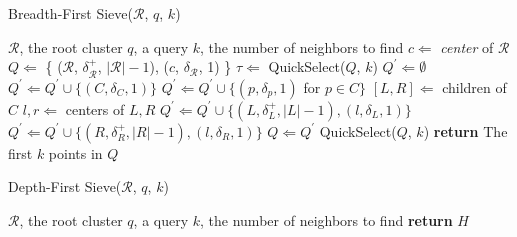 \documentclass{article}
\begin{document}
\begin{algorithm}
    \caption{Breadth-First Sieve($\mathcal{R}$, $q$, $k$)} %
    \label{alg:methods:bredth-first-sieve} %
    \begin{algorithmic} %
        \Require $\mathcal{R}$, the root cluster
        \Require $q$, a query
        \Require $k$, the number of neighbors to find
        \State $c \Leftarrow$ \textit{center} of $\mathcal{R}$
        \State $Q \Leftarrow$ \{ ($\mathcal{R}$, $\delta^{+}_{\mathcal{R}}$, $|\mathcal{R}| - 1$), ($c$, $\delta_{\mathcal{R}}$, 1) \}
            \State $\tau \Leftarrow$ QuickSelect($Q$, $k$)
            \State $Q^{'} \Leftarrow \emptyset$
                        \State $Q^{'} \Leftarrow Q^{'} \cup \{ (C, \delta_{C}, 1) \}$
                        \State $Q^{'} \Leftarrow Q^{'} \cup \{ (p, \delta_{p}, 1)$ for $p \in C \}$
                    \Else
                        \State $[L, R] \Leftarrow$ children of $C$
                        \State $l, r \Leftarrow$ centers of $L, R$
                        \State $Q^{'} \Leftarrow Q^{'} \cup \{ (L, \delta^{+}_{L}, |L| - 1), (l, \delta_{L}, 1) \}$
                        \State $Q^{'} \Leftarrow Q^{'} \cup \{ (R, \delta^{+}_{R}, |R| - 1), (l, \delta_{R}, 1) \}$
                    \EndIf
                \EndIf
            \EndFor
            \State $Q \Leftarrow Q^{'}$
        \EndWhile
        \State QuickSelect($Q$, $k$)
        \State \textbf{return} The first $k$ points in $Q$
    \end{algorithmic}
\end{algorithm}

\begin{algorithm}
    \caption{Depth-First Sieve($\mathcal{R}$, $q$, $k$)}
    \label{alg:methods:depth-first-sieve}
    \begin{algorithmic}
        \Require $\mathcal{R}$, the root cluster
        \Require $q$, a query
        \Require $k$, the number of neighbors to find
            \EndWhile
            \EndFor
        \EndWhile
        \State \textbf{return} $H$
    \end{algorithmic}
\end{algorithm}
\end{document}
